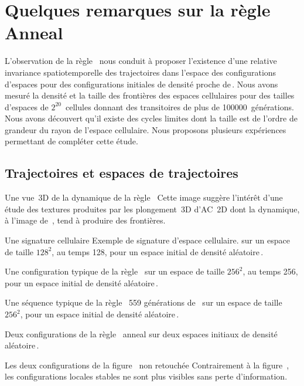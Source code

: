 \chapter[remarques sur la r\`egle Anneal]%
{Quelques remarques sur la r\`egle Anneal}

L'observation de la r\`egle~ nous conduit \`a proposer l'existence
d'une relative invariance spatiotemporelle des trajectoires dans
l'espace des configurations d'espaces pour des configurations initiales
de densit\'e proche de\,\undemi. %
Nous avons mesur\'e la densit\'e et la taille des fronti\`eres des espaces
cellulaires pour des tailles d'espaces de $2^{20}$~cellules donnant
des transitoires de plus de 100000~g\'en\'erations. %
Nous avons d\'ecouvert qu'il existe des cycles limites dont la taille
est de l'ordre de grandeur du rayon de l'espace cellulaire. %
Nous proposons plusieurs exp\'eriences permettant de compl\'eter cette
\'etude. %

\section{Trajectoires et espaces de trajectoires}

%
{}%
{Une vue~3D de la dynamique de la r\`egle~}%
{Cette image sugg\`ere l'int\'er\^et d'une \'etude des textures produites par
  les plongement~3D d'AC~2D dont la dynamique, \`a l'image
  de~, tend \`a produire des fronti\`eres.}

%
{Une signature cellulaire}%
{Exemple de signature d'espace cellulaire.}%
{ sur un espace de taille $128^2$, au temps 128, pour un espace
  initial de densit\'e al\'eatoire\,\Sundemi.}

%
{}%
{Une configuration typique de la r\`egle~}%
{ sur un espace de taille $256^2$, au temps 256,
  pour un espace initial de densit\'e al\'eatoire\,\Sundemi.}

%
{}%
{Une s\'equence typique de la r\`egle~}%
{559 g\'en\'erations de~ sur un espace de taille $256^2$,
  pour un espace initial de densit\'e al\'eatoire\,\Sundemi.}

%
{}%
{Deux configurations de la r\`egle~}%
{anneal sur deux espaces initiaux de densit\'e al\'eatoire\,\Sundemi.}

%
{}%
{Les deux configurations de la figure~\protect{} non retouch\'ee}%
{Contrairement \`a la figure~, les configurations
  locales stables ne sont plus visibles sans perte d'information.}

